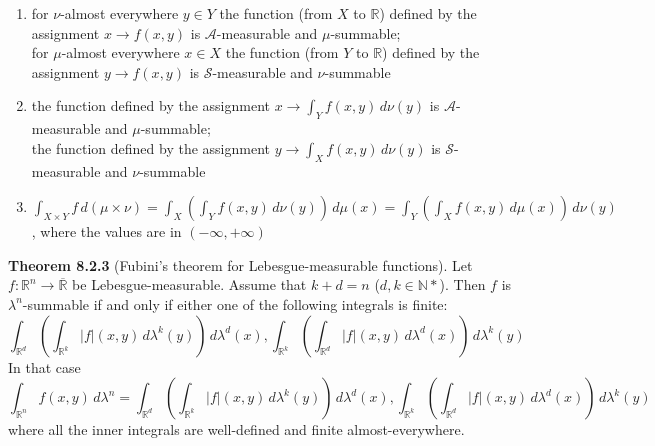\documentclass[a4paper,14pt]{extarticle}
\theoremstyle{definition}
\begin{document}
\begin{enumerate}
  \item for $\nu$-almost everywhere $y\in Y$ the function (from $X$ to $\mathbb{R}$) defined by the assignment $x\rightarrow f(x,y)$ is $\mathcal{A}$-measurable and $\mu$-summable; \\
  for $\mu$-almost everywhere $x\in X$ the function (from $Y$ to $\mathbb{R}$) defined by the assignment $y\rightarrow f(x,y)$ is $\mathcal{S}$-measurable and $\nu$-summable
  \item the function defined by the assignment $x\rightarrow \int_Y f(x,y) \,d\nu(y)$ is $\mathcal{A}$-measurable and $\mu$-summable; \\
  the function defined by the assignment $y\rightarrow \int_X f(x,y) \,d\nu(y)$ is $\mathcal{S}$-measurable and $\nu$-summable
  \item $\int_{X\times Y} f \,d(\mu\times\nu) =
  \int_X\left(\int_Y f(x,y) \,d\nu(y)\right) \,d\mu(x) = \int_Y\left(\int_X f(x,y) \,d\mu(x)\right) \,d\nu(y)$,
  where the values are in $(-\infty,+\infty)$
\end{enumerate}

\vspace{12pt}

\noindent\textbf{Theorem 8.2.3} (Fubini's theorem for Lebesgue-measurable functions). Let $f:\mathbb{R}^n\rightarrow\overline{\mathbb{R}}$ be Lebesgue-measurable. Assume that $k+d=n$ ($d,k\in\mathbb{N}*$). Then $f$ is $\lambda^n$-summable if and only if either one of the following integrals is finite:
\[\int_{\mathbb{R}^d}\left(\int_{\mathbb{R}^k}|f|(x,y) \,d\lambda^k(y)\right) \,d\lambda^d(x), \int_{\mathbb{R}^k}\left(\int_{\mathbb{R}^d}|f|(x,y) \,d\lambda^d(x)\right) \,d\lambda^k(y)\]
In that case \\
\small\[\int_{\mathbb{R}^n} f(x,y) \,d\lambda^n=\int_{\mathbb{R}^d}\left(\int_{\mathbb{R}^k}|f|(x,y) \,d\lambda^k(y)\right) \,d\lambda^d(x), \int_{\mathbb{R}^k}\left(\int_{\mathbb{R}^d}|f|(x,y) \,d\lambda^d(x)\right) \,d\lambda^k(y)\]
where all the inner integrals are well-defined and finite almost-everywhere.
\end{document}

